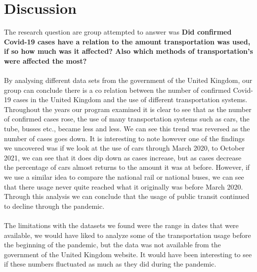 \documentclass[fontsize=11pt]{article}
\begin{document}
\section*{Discussion}

The research question are group attempted to answer was \textbf{Did confirmed Covid-19 cases have a relation to the amount transportation was used, if so how much was it affected? Also which methods of transportation's were affected the most?} \\ \\

By analysing different data sets from the government of the United Kingdom, our group can conclude there is a co relation between the number of confirmed Covid-19 cases in the United Kingdom and the use of different transportation systems. Throughout the years our program examined it is clear to see that as the number of confirmed cases rose, the use of many transportation systems such as cars, the tube, busses etc., became less and less. We can see this trend was reversed as the number of cases goes down. It is interesting to note however one of the findings we uncovered was if we look at the use of cars through March 2020, to October 2021, we can see that it does dip down as cases increase, but as cases decrease the percentage of cars almost returns to the amount it was at before. However, if we use a similar idea to compare the national rail or national buses, we can see that there usage never quite reached what it originally was before March 2020. Through this analysis we can conclude that the usage of public transit continued to decline through the pandemic. \\ \\

The limitations with the datasets we found were the range in dates that were available, we would have liked to analyze some of the transportation usage before the beginning of the pandemic, but the data was not available from the government of the United Kingdom website. It would have been interesting to see if these numbers fluctuated as much as they did during the pandemic. \\ \\
\end{document}
